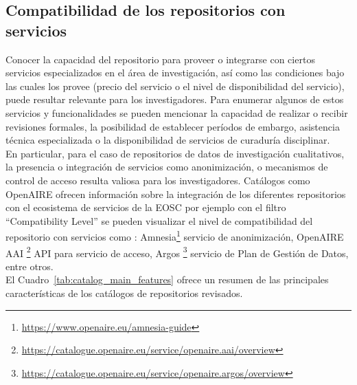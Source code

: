 \documentclass[runningheads]{llncs}
\begin{document}
\subsection*{Compatibilidad de los repositorios con servicios}
Conocer la capacidad del repositorio para proveer o integrarse con ciertos servicios especializados en el área de investigación, así como las condiciones bajo las cuales los provee (precio del servicio o el nivel de disponibilidad del servicio), puede resultar relevante para los investigadores.  
Para enumerar algunos de estos servicios y funcionalidades se pueden mencionar la capacidad de realizar o recibir revisiones formales, la posibilidad de establecer períodos de embargo, asistencia técnica especializada o la disponibilidad de servicios de curaduría disciplinar.\\
En particular, para el caso de repositorios de datos de investigación cualitativos, la presencia o integración de servicios como anonimización, o mecanismos de control de acceso resulta valiosa para los investigadores. 
Catálogos como OpenAIRE ofrecen información sobre la integración de los diferentes repositorios con el ecosistema de servicios de la EOSC por ejemplo con el filtro ``Compatibility Level''  se pueden visualizar el nivel de compatibilidad del repositorio con servicios como : Amnesia\footnote{\url{https://www.openaire.eu/amnesia-guide}} servicio de anonimización, OpenAIRE AAI \footnote{\url{https://catalogue.openaire.eu/service/openaire.aai/overview}} API para servicio de acceso, Argos \footnote{\url{https://catalogue.openaire.eu/service/openaire.argos/overview}} servicio de Plan de Gestión de Datos, entre otros.  \\


El Cuadro~\ref{tab:catalog_main_features} ofrece un resumen de las principales características de los catálogos de repositorios revisados.




\end{document}
